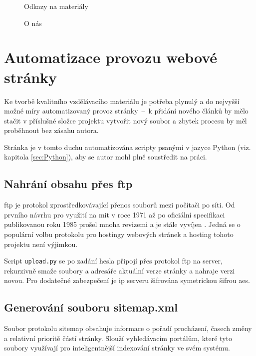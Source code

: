 \documentclass[a4paper, 12pt]{article}
\newcommand*{\fullref}[1]{\hyperref[{#1}]{\ref*{#1}}}
\begin{document}
  \begin{figure}[H]
      \caption{Odkazy na materiály} \label{img:Odkazy na materiály}
    \endminipage\hfill
      \caption{O nás} \label{img:O nás}
    \endminipage
  \end{figure}


  \section{Automatizace provozu webové stránky} \label{sec:Automatizace provozu webové stránky}
  Ke tvorbě kvalitního vzdělávacího materiálu je potřeba plynulý a do nejvyšší možné míry automatizovaný provoz stránky~--~k přidání nového článků by mělo stačit v příslušné složce projektu vytvořit nový soubor a zbytek procesu by měl proběhnout bez zásahu autora.

  Stránka je v tomto duchu automatizována scripty psanými v jazyce Python (viz. kapitola \fullref{sec:Python}), aby se autor mohl plně soustředit na práci.


  \subsection{Nahrání obsahu přes \acrshort{ftp}}
  \gls{ftp} je protokol zprostředkovávající přenos souborů mezi počítači po síti. Od prvního návrhu pro využití na \gls{mit} v roce 1971 až po oficiální specifikaci publikovanou roku 1985 prošel mnoha revizemi a je stále vyvíjen \cite{ftp-specification}. Jedná se o populární volbu protokolu pro hostingy webových stránek a hosting tohoto projektu není výjimkou.

  Script \texttt{upload.py} se po zadání hesla připojí přes protokol \gls{ftp} na server, rekurzivně smaže soubory a adresáře aktuální verze stránky a nahraje verzi novou. Pro dodatečné zabezpečení je \gls{ip} serveru šifrována symetrickou šifrou \gls{aes}.


  \subsection{Generování souboru sitemap.xml}
  Soubor protokolu sitemap obsahuje informace o pořadí procházení, časech změny a relativní prioritě částí stránky. Slouží vyhledávacím portálům, které tyto soubory využívají pro inteligentnější indexování stránky ve svém systému.
\end{document}
